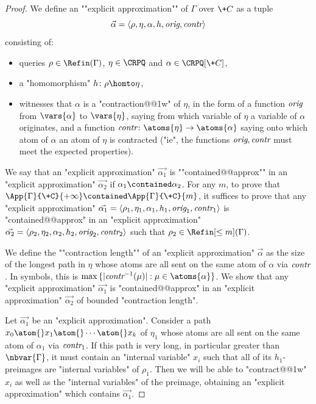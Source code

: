 \begin{proof}
	We define an \AP""explicit approximation"" of $\Gamma$ over $\+C$ as a tuple
	\[\vec{\alpha} = \langle\rho, \eta, \alpha, h, \textit{orig}, \textit{contr}\rangle\]
	consisting of:
	\begin{itemize}
		\item queries $\rho \in \Refin(\Gamma)$, $\eta \in \CRPQ$ and
			$\alpha \in \CRPQ[\+C]$,
		\item a "homomorphism" $h\colon \rho \homto \eta$,
		\item witnesses that $\alpha$ is a "contraction@@1w" of $\eta$, in the form of
			a function $\textit{orig}$ from $\vars{\alpha}$ to $\vars{\eta}$,
			saying from which variable of $\eta$ a variable of $\alpha$ originates,
			and a function $\cont \colon \atoms{\eta} \to \atoms{\alpha}$
			saying onto which atom of $\alpha$ an atom of $\eta$ is contracted ("ie", the functions $\textit{orig},\textit{contr}$ must meet the expected properties).
	\end{itemize}
	We say that an "explicit approximation" $\vec{\alpha_1}$ is \AP""contained@@approx"" in
	an "explicit approximation" $\vec{\alpha_2}$ if $\alpha_1 \contained \alpha_2$.
	For any $m$, to prove that $\App{\Gamma}{\+C}{+\infty} \contained \App{\Gamma}{\+C}{m}$,
	it suffices to prove that any "explicit approximation" $\vec{\alpha_1}=\langle\rho_1, \eta_1, \alpha_1, h_1, \textit{orig}_1, \textit{contr}_1\rangle$ is "contained@@approx"
	in an "explicit approximation" $\vec{\alpha_2}=\langle\rho_2, \eta_2, \alpha_2, h_2, \textit{orig}_2, \textit{contr}_2\rangle$ such that $\rho_2 \in \Refin[\leq m](\Gamma)$.

	We define the \AP""contraction length"" of an "explicit approximation" $\vec{\alpha}$
	as the size of the longest path in $\eta$ whose atoms are all sent on the same
	atom of $\alpha$ via $\textit{contr}$. In symbols, this is $\max{\set{|\cont^{-1}(\mu)| : \mu \in \atoms{\alpha}}}$.
	We show that any "explicit approximation" $\vec{\alpha_1}$ is "contained@@approx"
	in an "explicit approximation" $\vec{\alpha_2}$ of bounded "contraction length".

	Let $\vec{\alpha_1}$ be an "explicit approximation".
	Consider a path $x_0 \atom{} x_1 \atom{} \cdots \atom{} x_k$ of $\eta_1$ whose
	atoms are all sent on the same atom of $\alpha_1$ via $\textit{contr}_1$. 
	If this path is very long, in particular greater than $\nbvar{\Gamma}$, it must contain an "internal variable" $x_i$ such that all of its $h_1$-preimages are "internal variables" of $\rho_1$. 
	Then we will be able to "contract@@1w" $x_i$ as well as the "internal variables" of the preimage, obtaining an "explicit approximation" which contains $\vec{\alpha_1}$.


\end{proof}
